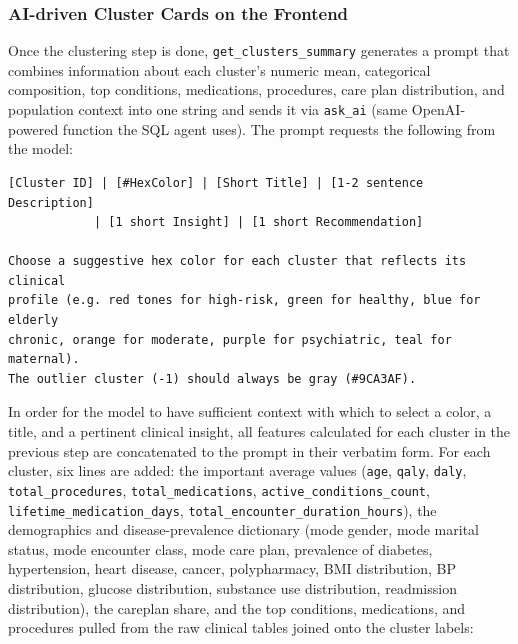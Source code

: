 \subsubsection*{AI-driven Cluster Cards on the Frontend}

Once the clustering step is done, \texttt{get\_clusters\_summary} generates a prompt that combines information about each cluster’s numeric mean, categorical composition, top conditions, medications, procedures, care plan distribution, and population context into one string and sends it via \texttt{ask\_ai} (same OpenAI-powered function the SQL agent uses). The prompt requests the following from the model:

\begin{lstlisting}[style=pythonstyle]
[Cluster ID] | [#HexColor] | [Short Title] | [1-2 sentence Description]
            | [1 short Insight] | [1 short Recommendation]

Choose a suggestive hex color for each cluster that reflects its clinical
profile (e.g. red tones for high-risk, green for healthy, blue for elderly
chronic, orange for moderate, purple for psychiatric, teal for maternal).
The outlier cluster (-1) should always be gray (#9CA3AF).
\end{lstlisting}

In order for the model to have sufficient context with which to select a color, a title, and a pertinent clinical insight, all features calculated for each cluster in the previous step are concatenated to the prompt in their verbatim form. For each cluster, six lines are added: the important average values (\texttt{age}, \texttt{qaly}, \texttt{daly}, \texttt{total\_procedures}, \texttt{total\_medications}, \texttt{active\_\allowbreak conditions\_\allowbreak count}, \texttt{lifetime\_\allowbreak medication\_\allowbreak days}, \texttt{total\_\allowbreak encounter\_\allowbreak duration\_\allowbreak hours}), the demographics and disease-prevalence dictionary (mode gender, mode marital status, mode encounter class, mode care plan, prevalence of diabetes, hypertension, heart disease, cancer, polypharmacy, BMI distribution, BP distribution, glucose distribution, substance use distribution, readmission distribution), the careplan share, and the top conditions, medications, and procedures pulled from the raw clinical tables joined onto the cluster labels:

